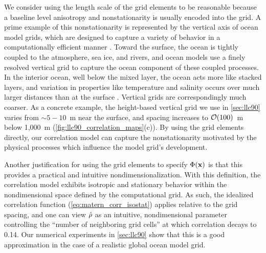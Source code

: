 We consider using the length scale of the grid elements to be reasonable
because a baseline level anisotropy and nonstationarity is usually encoded
into the grid.
A prime example of this nonstationarity is represented by the vertical axis of
ocean model grids, which are designed to capture a variety of behavior in a
computationally efficient manner \citep{griffies_fundamentals_2004}.
Toward the surface, the ocean is tightly coupled to the atmosphere, sea ice, and
rivers, and ocean models use a finely resolved vertical grid to capture the
ocean component of these coupled processes.
In the interior ocean, well below the mixed layer, the ocean acts more like stacked layers, and
variation in properties like temperature and salinity occurs over much larger
distances than at the surface \citep{talley_descriptive_2011}.
Vertical grids are correspondingly much coarser.
As a concrete example, the height-based vertical grid we use in \cref{sec:llc90}
varies from $\sim 5-10$~m near the surface, and spacing increases to
$\mathcal{O}(100)$~m below 1,000~m (\cref{fig:llc90_correlation_maps}(c)).
By using the grid elements directly, our correlation model can capture the
nonstationarity motivated by the physical processes which influence the model
grid's development.

Another justification for using the grid elements to specify $\Phi(\mathbf{x})$ is
that this provides a practical and intuitive nondimensionalization.
With this definition, the correlation model exhibits isotropic and stationary
behavior within the nondimensional space defined by the computational grid.
As such, the idealized correlation function (\cref{eq:matern_corr_isostat})
applies relative to the grid spacing, and one can view $\hat{\rho}$ as an
intuitive, nondimensional parameter controlling the
``number of neighboring grid cells'' at which correlation decays to 0.14.
Our numerical experiments in \cref{sec:llc90} show that this is a good
approximation in the case of a realistic global ocean model grid.
